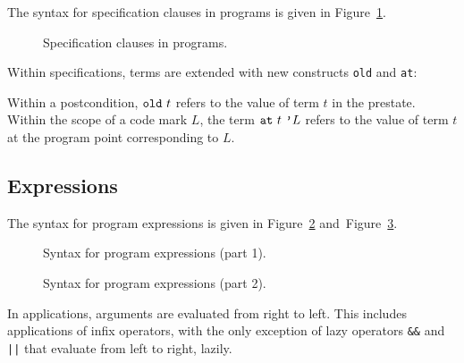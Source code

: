 The syntax for specification clauses in programs
is given in Figure~\ref{fig:bnf:spec}.
\begin{figure}
  \begin{center}\framebox{}\end{center}
  \caption{Specification clauses in programs.}
\label{fig:bnf:spec}
\end{figure}
Within specifications, terms are extended with new constructs
\verb|old| and \verb|at|:
\begin{center}\framebox{}\end{center}
Within a postcondition, $\verb|old|~t$ refers to the value of term $t$
in the prestate. Within the scope of a code mark $L$,
the term $\verb|at|~t~\verb|'|L$ refers to the value of term $t$ at the program
point corresponding to $L$.

\subsection{Expressions}

The syntax for program expressions is given in
Figure~\ref{fig:bnf:expra} and~Figure~\ref{fig:bnf:exprb}.
\begin{figure}
  \begin{center}\framebox{}\end{center}
  \caption{Syntax for program expressions (part 1).}
\label{fig:bnf:expra}
\end{figure}

\begin{figure}
  \begin{center}\framebox{}\end{center}
  \caption{Syntax for program expressions (part 2).}
\label{fig:bnf:exprb}
\end{figure}

In applications, arguments are evaluated from right to left.
This includes applications of infix operators, with the only exception of
lazy operators \verb|&&| and \verb+||+ that evaluate from left to
right, lazily.







